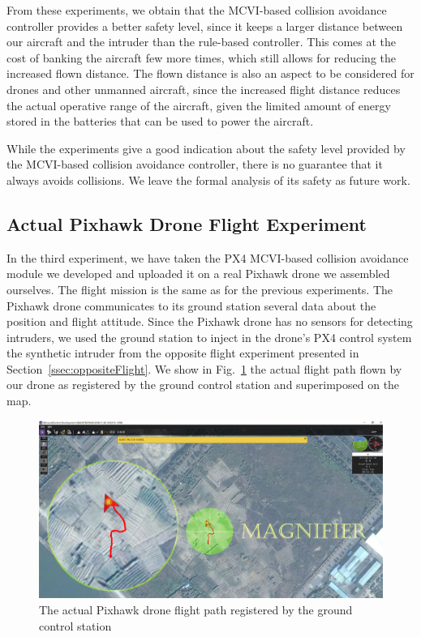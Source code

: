 \documentclass{article}
\begin{document}
From these experiments, we obtain that the MCVI-based collision avoidance controller provides a better safety level, since it keeps a larger distance between our aircraft and the intruder than the rule-based controller.
This comes at the cost of banking the aircraft few more times, which still allows for reducing the increased flown distance.
The flown distance is also an aspect to be considered for drones and other unmanned aircraft, since the increased flight distance reduces the actual operative range of the aircraft, given the limited amount of energy stored in the batteries that can be used to power the aircraft.

While the experiments give a good indication about the safety level provided by the MCVI-based collision avoidance controller, there is no guarantee that it always avoids collisions.
We leave the formal analysis of its safety as future work.


\subsection{Actual Pixhawk Drone Flight Experiment}
\label{ssec:realDrone}

In the third experiment, we have taken the PX4 MCVI-based collision avoidance module we developed and uploaded it on a real Pixhawk drone we assembled ourselves. %
The flight mission is the same as for the previous experiments. 
The Pixhawk drone communicates to its ground station several data about the position and flight attitude.
Since the Pixhawk drone has no sensors for detecting intruders, we used the ground station to inject in the drone's PX4 control system the synthetic intruder from the opposite flight experiment presented in Section~\ref{ssec:oppositeFlight}.
We show in Fig.~\ref{fig:realFlightPath} the actual flight path flown by our drone as registered by the ground control station and superimposed on the map.

\begin{figure}[t]
	\centering 
	\includegraphics[width=1\linewidth]{realFlightPath.jpg}
	\caption{The actual Pixhawk drone flight path registered by the ground control station}
	\label{fig:realFlightPath}
\end{figure}
\end{document}
